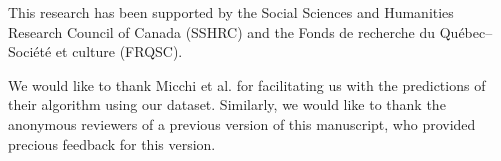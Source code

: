 \documentclass[sigconf]{acmart}
\begin{document}

\begin{acks}
This research has been supported by the Social Sciences and Humanities Research Council of Canada (SSHRC) and the Fonds de recherche du Québec–Société et culture (FRQSC).

We would like to thank Micchi et al. for facilitating us with the predictions of their algorithm \cite{micchi20roman} using our dataset. Similarly, we would like to thank the anonymous reviewers of a previous version of this manuscript, who provided precious feedback for this version.
\end{acks}




%
%



\end{document}
